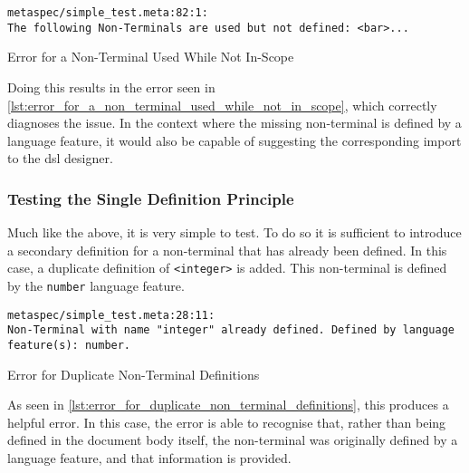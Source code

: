 \begin{listing}[!htb]
\begin{verbatim}
metaspec/simple_test.meta:82:1:
The following Non-Terminals are used but not defined: <bar>... 
\end{verbatim}
\caption{Error for a Non-Terminal Used While Not In-Scope}
\label{lst:error_for_a_non_terminal_used_while_not_in_scope}
\end{listing}

Doing this results in the error seen in \autoref{lst:error_for_a_non_terminal_used_while_not_in_scope}, which correctly diagnoses the issue.
In the context where the missing non-terminal is defined by a language feature, it would also be capable of suggesting the corresponding import to the \gls{dsl} designer.


\subsubsection{Testing the Single Definition Principle} %
\label{ssub:testing_the_single_definition_principle}
Much like the above, it is very simple to test.
To do so it is sufficient to introduce a secondary definition for a non-terminal that has already been defined. 
In this case, a duplicate definition of \texttt{<integer>} is added.
This non-terminal is defined by the \texttt{number} language feature.

\begin{listing}[!htb]
\begin{verbatim}
metaspec/simple_test.meta:28:11:
Non-Terminal with name "integer" already defined. Defined by language feature(s): number.
\end{verbatim}
\caption{Error for Duplicate Non-Terminal Definitions}
\label{lst:error_for_duplicate_non_terminal_definitions}
\end{listing}

As seen in \autoref{lst:error_for_duplicate_non_terminal_definitions}, this produces a helpful error. 
In this case, the error is able to recognise that, rather than being defined in the document body itself, the non-terminal was originally defined by a language feature, and that information is provided. 


